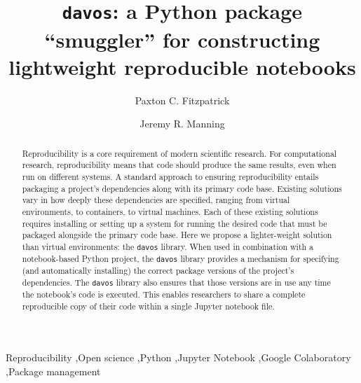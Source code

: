 \documentclass[preprint,12pt, a4paper]{elsarticle}
\begin{document}
\begin{frontmatter}

\title{\texttt{davos}: a Python package ``smuggler'' for constructing
  lightweight reproducible notebooks}
\author{Paxton C. Fitzpatrick}
\author{Jeremy R. Manning}
\address{Department of Psychological and Brain Sciences\\Dartmouth College, Hanover, NH 03755}


\begin{abstract}

  Reproducibility is a core requirement of modern scientific research.
  For computational research, reproducibility means that code should
  produce the same results, even when run on different systems.  A
  standard approach to ensuring reproducibility entails packaging a
  project's dependencies along with its primary code base.  Existing
  solutions vary in how deeply these dependencies are specified,
  ranging from virtual environments, to containers, to virtual
  machines.  Each of these existing solutions requires installing or
  setting up a system for running the desired code that must be
  packaged alongside the primary code base.  Here we propose a
  lighter-weight solution than virtual environments: the
  \texttt{davos} library.  When used in combination with a
  notebook-based Python project, the \texttt{davos} library provides a
  mechanism for specifying (and automatically installing) the correct
  package versions of the project's dependencies.  The \texttt{davos}
  library also ensures that those versions are in use any time the
  notebook's code is executed.  This enables researchers to share a complete
  reproducible copy of their code within a single Jupyter notebook file.

\end{abstract}


\begin{keyword}
Reproducibility \sep Open science \sep Python \sep Jupyter Notebook \sep Google Colaboratory \sep Package management
\end{keyword}

\end{frontmatter}


\end{document}
